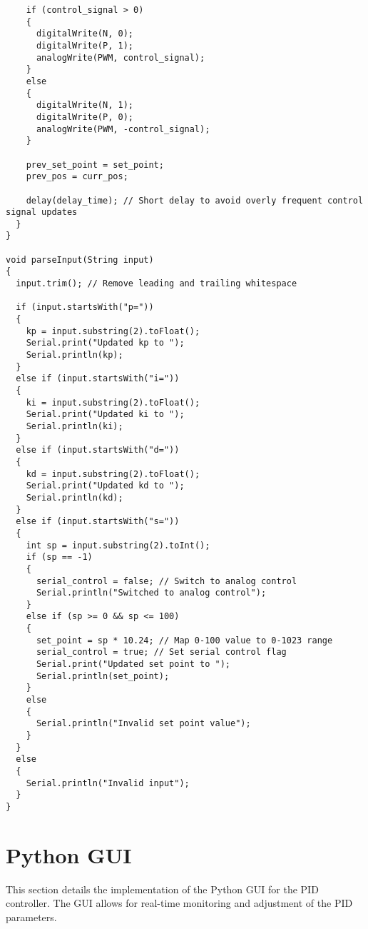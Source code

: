 \documentclass{article}
\begin{document}
\begin{verbatim}
    if (control_signal > 0)
    {
      digitalWrite(N, 0);
      digitalWrite(P, 1);
      analogWrite(PWM, control_signal);
    }
    else
    {
      digitalWrite(N, 1);
      digitalWrite(P, 0);
      analogWrite(PWM, -control_signal);
    }

    prev_set_point = set_point;
    prev_pos = curr_pos;

    delay(delay_time); // Short delay to avoid overly frequent control signal updates
  }
}

void parseInput(String input)
{
  input.trim(); // Remove leading and trailing whitespace

  if (input.startsWith("p="))
  {
    kp = input.substring(2).toFloat();
    Serial.print("Updated kp to ");
    Serial.println(kp);
  }
  else if (input.startsWith("i="))
  {
    ki = input.substring(2).toFloat();
    Serial.print("Updated ki to ");
    Serial.println(ki);
  }
  else if (input.startsWith("d="))
  {
    kd = input.substring(2).toFloat();
    Serial.print("Updated kd to ");
    Serial.println(kd);
  }
  else if (input.startsWith("s="))
  {
    int sp = input.substring(2).toInt();
    if (sp == -1)
    {
      serial_control = false; // Switch to analog control
      Serial.println("Switched to analog control");
    }
    else if (sp >= 0 && sp <= 100)
    {
      set_point = sp * 10.24; // Map 0-100 value to 0-1023 range
      serial_control = true; // Set serial control flag
      Serial.print("Updated set point to ");
      Serial.println(set_point);
    }
    else
    {
      Serial.println("Invalid set point value");
    }
  }
  else
  {
    Serial.println("Invalid input");
  }
}
\end{verbatim}

\section{Python GUI}
This section details the implementation of the Python GUI for the PID controller. The GUI allows for real-time monitoring and adjustment of the PID parameters.
\end{document}
